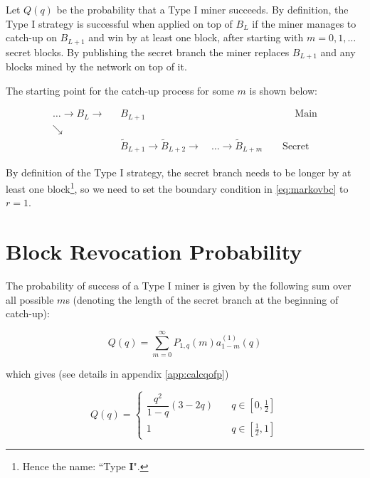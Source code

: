 \documentclass[letterpaper,12pt]{report}
\theoremstyle{plain}
\theoremstyle{definition}
\begin{document}
Let $\mathit{Q}(q)$ be the probability that a Type I miner succeeds. By definition, the Type I strategy is successful when applied on top of $\mathit{B}_L$ if the miner manages to catch-up on $B_{L+1}$ and win by at least one block, after starting with $m=0,1,\dots$ secret blocks. 
By publishing the secret branch the miner replaces $\mathit{B}_{L+1}$ and any blocks mined by the network on top of it. 



The starting point for the catch-up process for some $m$ is shown below:

\begin{eqnarray}\label{blockhidingboundary}
 \dots \rightarrow \mathit{B}_L\rightarrow &\mathit{B}_{L+1} \qquad\qquad\qquad\qquad\qquad\qquad\qquad\quad \mathrm{Main}\\\nonumber
\searrow & \\\nonumber
\qquad \qquad \qquad & \widetilde{\mathit{B}}_{L+1}\rightarrow\widetilde{\mathit{B}}_{L+2}
\longrightarrow \quad \dots \longrightarrow\widetilde{\mathit{B}}_{L+m}\qquad \mathrm{Secret}
\end{eqnarray}

By definition of the Type I strategy, the secret branch needs to be longer by at least one block\footnote{Hence the name: ``Type \textbf{I}".}, so we need to set the boundary condition in \ref{eq:markovbc} to $r=1$. 

\section{Block Revocation Probability}

The probability of success of a Type I miner is given by the following sum over all possible $m$s (denoting the length of the secret branch at the beginning of catch-up):

\begin{equation}\label{eq:qofpdef}
\mathit{Q}(q)=\sum_{m=0}^{\infty}\mathit{P}_{1,q}(m)\mathit{a}^{(1)}_{1-m}(q)
\end{equation}

which gives (see details in appendix \ref{app:calcqofp})

\begin{equation}\label{eq:qofp}
\mathit{Q}(q)=
\begin{cases}
\dfrac{q^2}{1-q}\left(3-2q\right) & \quad q \in [0,\frac{1}{2}] \\
1 & \quad q \in [\frac{1}{2},1] 
\end{cases}
\end{equation}
\end{document}
